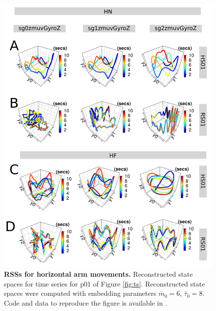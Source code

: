 \documentclass[fleqn,10pt]{wlscirep}
\begin{document}
\begin{figure}[ht]
\centering
\includegraphics[width=1.0\textwidth]{fig3}
\caption{
	{\bf RSSs for horizontal arm movements.}
	Reconstructed state spaces for time series for p01 of Figure \ref{fig:ts}.
	Reconstructed state spaces were computed with 
	embedding parameters 
	$\overline{m}_0=6$, $\overline{\tau}_0=8$.
	Code and data to reproduce the figure is available in \cite{srep2020}.
        }
    \label{fig:rss_aHw10}
\end{figure}
\end{document}
